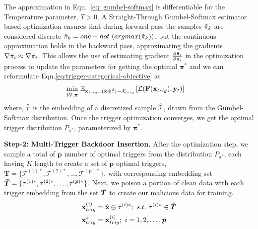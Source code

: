 \documentclass{article}
\newcommand{\Tc}{\mathcal{T}}
\newcommand{\Xc}{\mathcal{X}}
\newcommand\xbf{\mathbf{x}}
\newcommand\ybf{\mathbf{y}}
\newcommand\Fbf{\mathbf{F}}
\begin{document}
The approximation in Eqn.~\ref{eq: gumbel-softmax} is differentiable for the Temperature parameter, $T>0$. A Straight-Through Gumbel-Softmax estimator~\cite{jang2016categorical} based optimization ensures that during forward pass the samples $\Tilde{\pi}_k$ are considered discrete $\hat{\pi}_k=one-hot~(argmax(\Tilde{\pi}_k))$, but the continuous approximation holds in the backward pass, approximating the gradients $\nabla \hat{\pi}_i \approx \nabla \Tilde{\pi}_i$. This allows the use of estimating gradient $\frac{\partial \Tilde{\pi}_i}{\partial \pi_i}$ in the optimization process to update the parameters for getting the optimal $\boldsymbol{\pi}^*$ and we can reformulate Eqn.\ref{eq:trigger-categorical-objective} as 
\begin{align}
    \min_{\mathcal{\hat{W}}, \boldsymbol{\pi}} \ &\mathbb{E}_{\xbf_{trig}= (\hat{\xbf}\oplus\hat{\Bar{\tau}}) \sim \Xc_{trig}}\left[ \mathcal{L}(\Fbf(\xbf_{trig}), \ybf_t) \right]
    \label{eq:trigger-final-objective}
\end{align}
where, $\hat{\Bar{\tau}}$ is the embedding of a discretized sample $\hat{\Tc}$, drawn from the  Gumbel-Softmax distribution. Once the trigger optimization converges, we get the optimal trigger distribution $P_{\pi^*}$, parameterized by $\boldsymbol{\pi^*}$.

\vspace{.5em}
\noindent\textbf{Step-2: Multi-Trigger Backdoor Insertion.}
After the optimization step, we sample a total of $\boldsymbol{p}$ number of optimal triggers from the distribution $P_{\pi^*}$, each having $K$ length to create a set of $\boldsymbol{p}$ optimal triggers, $\boldsymbol{T}=\{\Tc^{(1)*},\Tc^{(2)*},\ldots, \Tc^{(\boldsymbol{p})*}\}$, with corresponding embedding set $\boldsymbol{\Bar{T}}=\{\Bar{\tau}^{(1)*},\Bar{\tau}^{(2)*},\ldots, \Bar{\tau}^{(\boldsymbol{p})*}\}$. Next, we poison a portion of clean data with each trigger embedding from the set $\boldsymbol{\Bar{T}}$ to create our malicious data for training. 
\begin{align}
    \xbf_{trig}^{(i)}&= \hat{\xbf}\oplus\Bar{\tau}^{(i)*};~s.t.~\Bar{\tau}^{(i)*} \in \boldsymbol{\Bar{T}} \notag\\
    \xbf_{trig}^{s}&= \xbf_{trig}^{(i)};~i=1,2,\ldots,\boldsymbol{p}
    \label{eq: Poisoned-data-creation}
\end{align}
\end{document}
